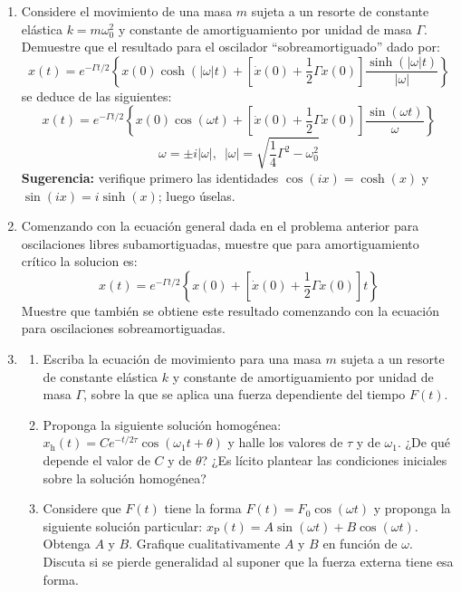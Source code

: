 \documentclass[11pt,spanish]{article}
\begin{document}
\begin{enumerate}
\begin{enumerate}
    \end{enumerate}



    \item Considere el movimiento de una masa $m$ sujeta a un resorte
    de constante elástica $k=m\omega_{0}^{2}$ y constante de
    amortiguamiento por unidad de masa $\Gamma$. Demuestre que el
    resultado para el oscilador ``sobreamortiguado'' dado por:
    \[
    x(t)=e^{-\Gamma t/2}\left\{ x(0)\cosh(\left|\omega\right|t) + \left[\dot{x}(0)+\frac{1}{2}\Gamma x(0)\right]\frac{\sinh(\left|\omega\right|t)}{\left|\omega\right|}\right\} 
    \]
    se deduce de las siguientes:
    \[
    x(t)=e^{-\Gamma t/2}\left\{ x(0)\cos(\omega t)+\left[\dot{x}(0)+\frac{1}{2}\Gamma x(0)\right]\frac{\sin(\omega t)}{\omega}\right\} 
    \]
    \[
    \omega=\pm i\left|\omega\right|,\,\,\,\left|\omega\right|=\sqrt{\frac{1}{4}\Gamma^{2}-\omega_{0}^{2}}
    \]
    \textbf{Sugerencia:} verifique primero las identidades $\cos(ix)=\cosh(x)$
    y $\sin(ix)=i\sinh(x)$; luego úselas.


    \item Comenzando con la ecuación general dada en el problema
    anterior para oscilaciones libres subamortiguadas, muestre que
    para amortiguamiento crítico la solucion es:
    \[
    x(t)=e^{-\Gamma t/2}\left\{ x(0)+\left[\dot{x}(0)+\frac{1}{2}\Gamma x(0)\right]t\right\} 
    \]
    Muestre que también se obtiene este resultado comenzando con la
    ecuación para oscilaciones sobreamortiguadas.

    \item 
    \begin{enumerate}
        \item Escriba la ecuación de movimiento para una masa $m$ sujeta a un
        resorte de constante elástica $k$ y constante de amortiguamiento por
        unidad de masa $\Gamma$, sobre la que se aplica una fuerza dependiente
        del tiempo $F(t)$. 

        \item Proponga la siguiente solución homogénea:
        $x_\text{h}(t)=Ce^{-t/2\tau}\cos(\omega_{1}t+\theta)$ y halle los
        valores de $\tau$ y de $\omega_{1}$. ¿De qué depende el valor de $C$ y
        de $\theta$? ¿Es lícito plantear las condiciones iniciales sobre la
        solución homogénea?
        
        \item Considere que $F(t)$ tiene la forma $F(t)=F_{0}\cos(\omega t)$ y
        proponga la siguiente solución particular:
        $x_\text{P}(t)=A\sin(\omega t)+B\cos(\omega t)$. Obtenga $A$ y $B$.
        Grafique cualitativamente $A$ y $B$ en función de $\omega$. Discuta si
        se pierde generalidad al suponer que la fuerza externa tiene esa forma.


\end{enumerate}
\end{enumerate}
\end{document}
